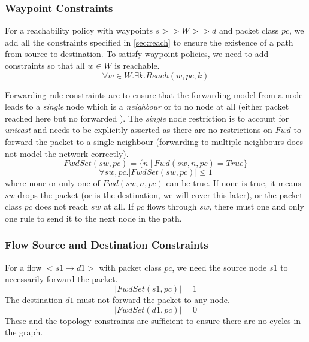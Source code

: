 \documentclass[]{sig}
\begin{document}
\subsubsection{Waypoint Constraints} 
For a reachability policy with waypoints $s >> W >> d$ and packet class $pc$, we add all the constraints specified in \cref{sec:reach} to ensure the existence of a path from source to destination. To satisfy waypoint policies, we need to add constraints so that all $w \in W$ is reachable. 
\begin{equation}
	\forall w \in W. \exists k. Reach(w, pc, k)
\end{equation}


Forwarding rule constraints are to ensure that the forwarding model from a node leads to a \emph{single} node which is a \emph{neighbour} or to no node at all (either packet reached here but no forwarded ). The \emph{single} node restriction is to account for \emph{unicast} and needs to be explicitly asserted as there are no restrictions on $Fwd$ to forward the packet to a single neighbour (forwarding to multiple neighbours does not model the network correctly).
\begin{equation}
	FwdSet(sw,pc) = \{n \ | \ Fwd(sw,n,pc) = True\}
\end{equation}
\begin{equation}
		\forall sw,pc .  |FwdSet(sw,pc)| \leq 1 \label{fwdset}
\end{equation}
where none or only one of $Fwd(sw,n,pc)$ can be true. If none is true, it means $sw$ drops the packet (or is the destination, we will cover this later), or the packet class $pc$ does not reach $sw$ at all. If $pc$ flows through $sw$, there must one and only one rule to send it to the next node in the path.\\ 

\subsubsection{Flow Source and Destination Constraints}
For a flow $<s1 \rightarrow d1>$ with packet class $pc$, we need the source node $s1$ to necessarily forward the packet. 
\begin{equation}
	|FwdSet(s1,pc)| = 1 \label{src} 
\end{equation}
The destination $d1$ must not forward the packet to any node. 
\begin{equation}
	|FwdSet(d1,pc)| = 0 \label{dst} 
\end{equation}
These and the topology constraints are sufficient to ensure there are no cycles in the graph. 
\end{document}

